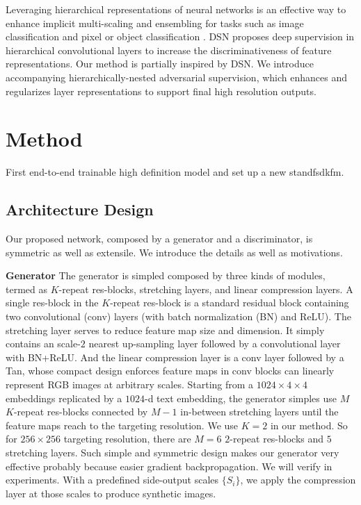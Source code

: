 \documentclass[10pt,twocolumn,letterpaper]{article}
\begin{document}
Leveraging hierarchical representations of neural networks is an effective way to enhance implicit multi-scaling and ensembling for tasks such as image classification \cite{lee2015deeply} and pixel or object classification \cite{xie2015holistically,cai2016unified,long2015fully}. DSN \cite{lee2015deeply} proposes deep supervision in hierarchical convolutional layers to increase the discriminativeness of feature representations. Our method is partially inspired by DSN. We introduce accompanying hierarchically-nested adversarial supervision, which enhances and regularizes layer representations to support final high resolution outputs.   

%
%
%

\section{Method}
First end-to-end trainable high definition model and set up a new standfsdkfm.

\subsection{Architecture Design}
Our proposed network, composed by a generator and a discriminator, is symmetric as well as extensile. We introduce the details as well as motivations.

\textbf{Generator} The generator is simpled composed by three kinds of modules, termed as $K$-repeat res-blocks, stretching layers, and linear compression layers.
A single res-block in the $K$-repeat res-block is a standard residual block  \cite{he2016identity} containing two convolutional (conv) layers (with batch normalization (BN) \cite{ioffe2015batch} and ReLU). The stretching layer serves to reduce feature map size and dimension. It simply contains an scale-$2$ nearest up-sampling layer followed by a convolutional layer with BN+ReLU. And the linear compression layer is a conv layer followed by a Tan, whose compact design enforces feature maps in conv blocks can linearly represent RGB images at arbitrary scales.
Starting from a $1024{\times}4{\times}4$ embeddings replicated by a $1024$-d text embedding, the generator simples use $M$ $K$-repeat res-blocks connected by $M{-}1$ in-between stretching layers until the feature maps reach to the targeting resolution. We use $K{=}2$ in our method. So for $256{\times}256$ targeting resolution, there are $M{=}6$ $2$-repeat res-blocks and $5$ stretching layers. Such simple and symmetric design makes our generator very effective probably because easier gradient backpropagation. We will verify in experiments. 
With a predefined side-output scales $\{S_i\}$, we apply the compression layer at those scales to produce synthetic images.
\end{document}
